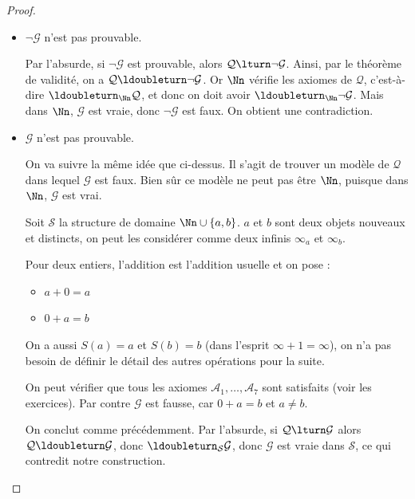 \documentclass[11pt,class=report,crop=false]{standalone}
\begin{document}
\begin{proof}
~
\begin{itemize}
	\item $\lnot \mathcal{G}$ n'est pas prouvable.
	
	Par l'absurde, si $\lnot \mathcal{G}$ est prouvable, alors $\mathcal{Q} \lturn \lnot \mathcal{G}$. Ainsi, par le théorème de validité, on a $\mathcal{Q} \ldoubleturn \lnot \mathcal{G}$. Or $\Nn$ vérifie les axiomes de $\mathcal{Q}$, c'est-à-dire $\ldoubleturn_{\Nn} \mathcal{Q}$, et donc on doit avoir $\ldoubleturn_{\Nn} \lnot \mathcal{G}$. Mais dans $\Nn$, $\mathcal{G}$ est vraie, donc $\lnot \mathcal{G}$ est faux. On obtient une contradiction.
	
	\item $\mathcal{G}$ n'est pas prouvable.
	
	On va suivre la même idée que ci-dessus. Il s'agit de trouver un modèle de $\mathcal{Q}$ dans lequel $\mathcal{G}$ est faux. Bien sûr ce modèle ne peut pas être $\Nn$, puisque dans $\Nn$, $\mathcal{G}$ est vrai.
	
	Soit $\mathcal{S}$ la structure de domaine $\Nn \cup \{a, b\}$.
	$a$ et $b$ sont deux objets nouveaux et distincts, on peut les considérer comme deux infinis $\infty_a$ et $\infty_b$.
	
	Pour deux entiers, l'addition est l'addition usuelle et on pose :
	\begin{itemize}
		\item $a+0=a$
		\item $0+a=b$
	\end{itemize}
	On a aussi $S(a)=a$ et $S(b)=b$ (dans l'esprit \og$\infty+1=\infty$\fg), on n'a pas besoin de définir le détail des autres opérations pour la suite.
	
	On peut vérifier que tous les axiomes $\mathcal{A}_1, \ldots, \mathcal{A}_7$ sont satisfaits (voir les exercices).
	Par contre $\mathcal{G}$ est fausse, car $0+a=b$ et $a \neq b$.
	
	On conclut comme précédemment. Par l'absurde, si $\mathcal{Q} \lturn \mathcal{G}$ alors $\mathcal{Q} \ldoubleturn \mathcal{G}$, donc $\ldoubleturn_{\mathcal{S}} \mathcal{G}$, donc $\mathcal{G}$ est vraie dans $\mathcal{S}$, ce qui contredit notre construction.
\end{itemize}
\end{proof}

\bigskip
\end{document}
